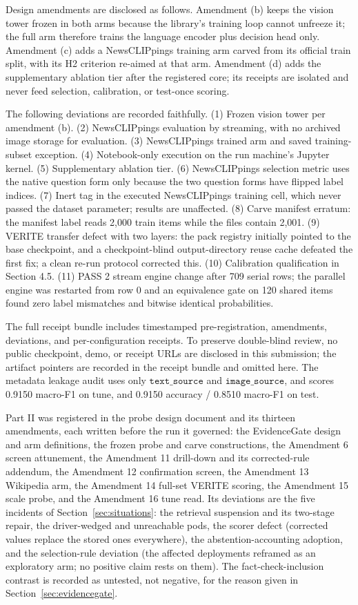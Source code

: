 \documentclass{article} %
\begin{document}
Design amendments are disclosed as follows. Amendment (b) keeps the vision tower frozen in both arms because the library's training loop cannot unfreeze it; the full arm therefore trains the language encoder plus decision head only. Amendment (c) adds a NewsCLIPpings training arm carved from its official train split, with its H2 criterion re-aimed at that arm. Amendment (d) adds the supplementary ablation tier after the registered core; its receipts are isolated and never feed selection, calibration, or test-once scoring.

The following deviations are recorded faithfully. (1) Frozen vision tower per amendment (b). (2) NewsCLIPpings evaluation by streaming, with no archived image storage for evaluation. (3) NewsCLIPpings trained arm and saved training-subset exception. (4) Notebook-only execution on the run machine's Jupyter kernel. (5) Supplementary ablation tier. (6) NewsCLIPpings selection metric uses the native question form only because the two question forms have flipped label indices. (7) Inert tag in the executed NewsCLIPpings training cell, which never passed the dataset parameter; results are unaffected. (8) Carve manifest erratum: the manifest label reads 2,000 train items while the files contain 2,001. (9) VERITE transfer defect with two layers: the pack registry initially pointed to the base checkpoint, and a checkpoint-blind output-directory reuse cache defeated the first fix; a clean re-run protocol corrected this. (10) Calibration qualification in Section 4.5. (11) PASS 2 stream engine change after 709 serial rows; the parallel engine was restarted from row 0 and an equivalence gate on 120 shared items found zero label mismatches and bitwise identical probabilities.

The full receipt bundle includes timestamped pre-registration, amendments, deviations, and per-configuration receipts. To preserve double-blind review, no public checkpoint, demo, or receipt URLs are disclosed in this submission; the artifact pointers are recorded in the receipt bundle and omitted here. The metadata leakage audit uses only \( \texttt{text\_source} \) and \( \texttt{image\_source} \), and scores 0.9150 macro-F1 on tune, and 0.9150 accuracy / 0.8510 macro-F1 on test.

Part II was registered in the probe design document and its thirteen amendments, each written before the run it governed: the EvidenceGate design and arm definitions, the frozen probe and carve constructions, the Amendment 6 screen attunement, the Amendment 11 drill-down and its corrected-rule addendum, the Amendment 12 confirmation screen, the Amendment 13 Wikipedia arm, the Amendment 14 full-set VERITE scoring, the Amendment 15 scale probe, and the Amendment 16 tune read. Its deviations are the five incidents of Section~\ref{sec:situations}: the retrieval suspension and its two-stage repair, the driver-wedged and unreachable pods, the scorer defect (corrected values replace the stored ones everywhere), the abstention-accounting adoption, and the selection-rule deviation (the affected deployments reframed as an exploratory arm; no positive claim rests on them). The fact-check-inclusion contrast is recorded as untested, not negative, for the reason given in Section~\ref{sec:evidencegate}.
\end{document}
